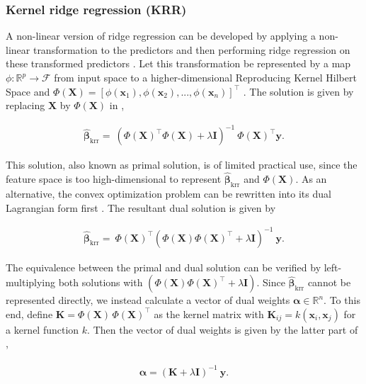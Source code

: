 \documentclass[utf8]{frontiersSCNS} %
\newcommand{\al}{\boldsymbol{\alpha}}
\newcommand{\bh}{\boldsymbol{\hat{\beta}}} %
\newcommand{\I}{\mathbf{I}}
\newcommand{\K}{\mathbf{K}}
\newcommand{\R}{\mathbb{R}}
\newcommand{\x}{\mathbf{x}}
\newcommand{\X}{\mathbf{X}}
\newcommand{\y}{\mathbf{y}}
\begin{document}
\subsubsection{Kernel ridge regression (KRR)}

A non-linear version of ridge regression can be developed by applying a non-linear transformation to the predictors and then performing ridge regression on these transformed predictors \citep{Hainmueller2014KernelApproach}. Let this transformation be represented by a map $\phi:\R^p\rightarrow\mathcal{F}$ from input space to a higher-dimensional Reproducing Kernel Hilbert Space and $\Phi(\X) = [\phi(\x_1),\phi(\x_2),...,\phi(\x_n)]^\top$ \citep{Scholkopf2003AKernels,Hofmann2008}. The solution is given by replacing $\X$ by $\Phi(\X)$ in ,

\begin{align*}
\bh_\text{krr} =\ (\Phi(\X)^\top\Phi(\X) + \lambda\I)^{-1}\ \Phi(\X)^\top\y.
\end{align*}

This solution, also known as primal solution, is of limited practical use, since the feature space is too high-dimensional to represent $\bh_\text{krr}$ and $\Phi(\X)$. As an alternative, the convex optimization problem can be rewritten into its dual Lagrangian form first  
\citep{Bishop2007}. The resultant dual solution is given by

\begin{align}
\label{eq:kernel_ridge_dual_solution}
\bh_\text{krr}  =\ \Phi(\X)^\top (\Phi(\X)\Phi(\X)^\top + \lambda\I)^{-1}\ \y.
\end{align}


The equivalence between the primal and dual solution can be verified by left-multiplying both solutions with $(\Phi(\X)\Phi(\X)^\top + \lambda\I)$. Since $\bh_\text{krr}$ cannot be represented directly, we instead calculate a vector of dual weights $\al\in\R^n$. To this end, define $\K = \Phi(\X)\,\Phi(\X)^\top$ as the kernel matrix with $\K_{ij} = k(\x_i, \x_j)$ for a kernel function $k$. Then the vector of dual weights is given by the latter part of , 

\begin{align}
\begin{split}
\label{eq:kernel_ridge}
\al = (\K + \lambda\I)^{-1}\ \y.
\end{split}
\end{align}
\end{document}
